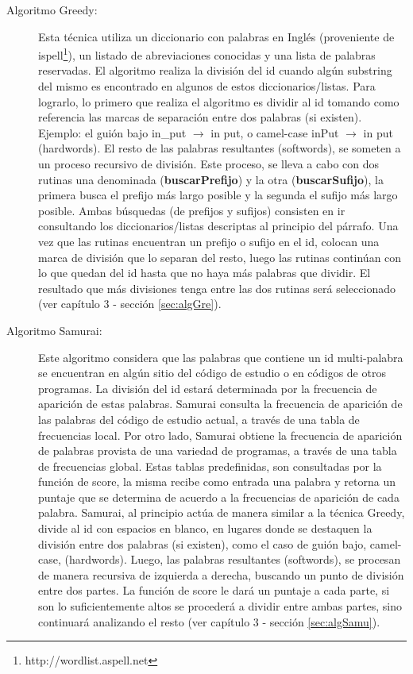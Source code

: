 \begin{description}

\item[Algoritmo Greedy:] Esta técnica utiliza un diccionario con palabras en Inglés (proveniente de ispell\footnote[1]{ http://wordlist.aspell.net}), un listado de abreviaciones conocidas y una lista de palabras reservadas. El algoritmo realiza la división del id cuando algún substring del mismo es encontrado en algunos de estos diccionarios/listas.
Para lograrlo, lo primero que realiza el algoritmo es dividir al id tomando como referencia las marcas de separación entre dos palabras (si existen). Ejemplo: el guión bajo \textsf{in\_put} $\rightarrow$ \textsf{in put}, o camel-case \textsf{inPut} $\rightarrow$ \textsf{in put} (hardwords). El resto de las palabras resultantes (softwords), se someten a un proceso recursivo de división.
Este proceso, se lleva a cabo con dos rutinas una denominada (\textbf{buscarPrefijo}) y la otra (\textbf{buscarSufijo}), la primera busca el prefijo más largo posible y la segunda el sufijo más largo posible. Ambas búsquedas (de prefijos y sufijos) consisten en ir consultando los diccionarios/listas descriptas al principio del párrafo. Una vez que las rutinas encuentran un prefijo o sufijo en el id, colocan una marca de división que lo separan del resto, luego las rutinas continúan con lo que quedan del id hasta que no haya más palabras que dividir. El resultado que más divisiones tenga entre las dos rutinas será seleccionado (ver capítulo 3 - sección \ref{sec:algGre}).

\item[Algoritmo Samurai:] Este algoritmo considera que las palabras que contiene un id multi-palabra se encuentran en algún sitio del código de estudio o en códigos de otros programas. La división del id estará determinada por la frecuencia de aparición de estas palabras. 
Samurai consulta la frecuencia de aparición de las palabras del código de estudio actual, a través de una tabla de frecuencias local. Por otro lado, Samurai obtiene la frecuencia de aparición de palabras provista de una variedad de programas, a través de una tabla de frecuencias global.
Estas tablas predefinidas, son consultadas por la función de score, la misma recibe como entrada una palabra y retorna un puntaje que se determina de acuerdo a la frecuencias de aparición de cada palabra.
Samurai, al principio actúa de manera similar a la técnica Greedy, divide al id con espacios en blanco, en lugares donde se destaquen la división entre dos palabras (si existen), como el caso de guión bajo, camel-case, (hardwords).
Luego, las palabras resultantes (softwords), se procesan de manera recursiva de izquierda a derecha, buscando un punto de división entre dos partes. La función de score le dará un puntaje a cada parte, si son lo suficientemente altos se procederá a dividir entre ambas partes, sino continuará analizando el resto (ver capítulo 3 - sección \ref{sec:algSamu}).

\end{description}

